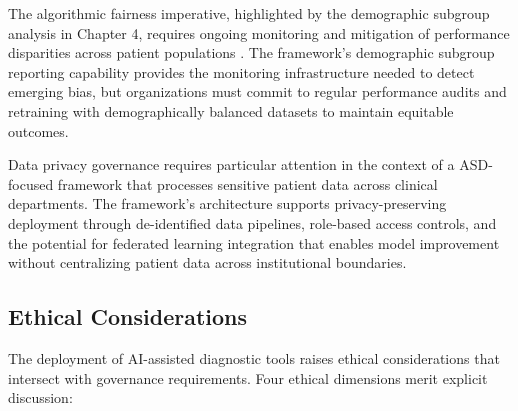 The algorithmic fairness imperative, highlighted by the demographic subgroup analysis in Chapter 4, requires ongoing monitoring and mitigation of performance disparities across patient populations \cite{jobin2019ethics, char2018ethics}. The framework's demographic subgroup reporting capability provides the monitoring infrastructure needed to detect emerging bias, but organizations must commit to regular performance audits and retraining with demographically balanced datasets to maintain equitable outcomes.

Data privacy governance requires particular attention in the context of a ASD-focused framework that processes sensitive patient data across clinical departments. The framework's architecture supports privacy-preserving deployment through de-identified data pipelines, role-based access controls, and the potential for federated learning integration \cite{rieke2020federated} that enables model improvement without centralizing patient data across institutional boundaries.

\subsection{Ethical Considerations}

The deployment of AI-assisted diagnostic tools raises ethical considerations that intersect with governance requirements. Four ethical dimensions merit explicit discussion:

